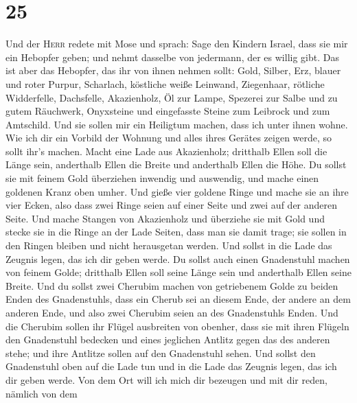 \hypertarget{section-24}{%
\section{25}\label{section-24}}

 Und der \textsc{Herr} redete mit Mose und sprach:
 Sage den Kindern Israel, dass sie mir ein Hebopfer geben;
und nehmt dasselbe von jedermann, der es willig gibt.  Das
ist aber das Hebopfer, das ihr von ihnen nehmen sollt: Gold, Silber,
Erz,  blauer und roter Purpur, Scharlach, köstliche weiße
Leinwand, Ziegenhaar,  rötliche Widderfelle, Dachsfelle,
Akazienholz,  Öl zur Lampe, Spezerei zur Salbe und zu
gutem Räuchwerk,  Onyxsteine und eingefasste Steine zum
Leibrock und zum Amtschild.  Und sie sollen mir ein
Heiligtum machen, dass ich unter ihnen wohne.  Wie ich dir
ein Vorbild der Wohnung und alles ihres Gerätes zeigen werde, so sollt
ihr's machen.  Macht eine Lade aus Akazienholz; dritthalb
Ellen soll die Länge sein, anderthalb Ellen die Breite und anderthalb
Ellen die Höhe.  Du sollst sie mit feinem Gold überziehen
inwendig und auswendig, und mache einen goldenen Kranz oben umher.
 Und gieße vier goldene Ringe und mache sie an ihre vier
Ecken, also dass zwei Ringe seien auf einer Seite und zwei auf der
anderen Seite.  Und mache Stangen von Akazienholz und
überziehe sie mit Gold  und stecke sie in die Ringe an
der Lade Seiten, dass man sie damit trage;  sie sollen in
den Ringen bleiben und nicht herausgetan werden.  Und
sollst in die Lade das Zeugnis legen, das ich dir geben werde.
 Du sollst auch einen Gnadenstuhl machen von feinem
Golde; dritthalb Ellen soll seine Länge sein und anderthalb Ellen seine
Breite.  Und du sollst zwei Cherubim machen von
getriebenem Golde zu beiden Enden des Gnadenstuhls,  dass
ein Cherub sei an diesem Ende, der andere an dem anderen Ende, und also
zwei Cherubim seien an des Gnadenstuhls Enden.  Und die
Cherubim sollen ihr Flügel ausbreiten von obenher, dass sie mit ihren
Flügeln den Gnadenstuhl bedecken und eines jeglichen Antlitz gegen das
des anderen stehe; und ihre Antlitze sollen auf den Gnadenstuhl sehen.
 Und sollst den Gnadenstuhl oben auf die Lade tun und in
die Lade das Zeugnis legen, das ich dir geben werde.  Von
dem Ort will ich mich dir bezeugen und mit dir reden, nämlich von dem
